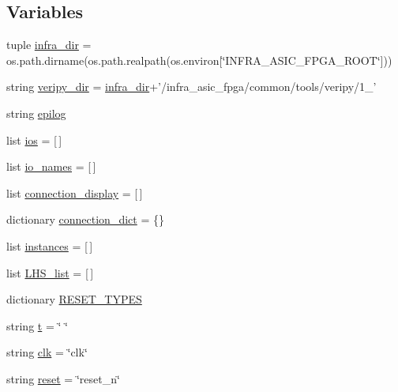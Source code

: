 \subsection*{Variables}
\begin{DoxyCompactItemize}
\item 
tuple \hyperlink{namespaceverilog__generator_ad90475de491c58d1bd0962f20cb9b26a}{infra\-\_\-dir} = os.\-path.\-dirname(os.\-path.\-realpath(os.\-environ\mbox{[}\char`\"{}I\-N\-F\-R\-A\-\_\-\-A\-S\-I\-C\-\_\-\-F\-P\-G\-A\-\_\-\-R\-O\-O\-T\char`\"{}\mbox{]}))
\item 
string \hyperlink{namespaceverilog__generator_aef66d07ac5937a888f2a6087df98f168}{veripy\-\_\-dir} = \hyperlink{namespaceverilog__generator_ad90475de491c58d1bd0962f20cb9b26a}{infra\-\_\-dir}+'/infra\-\_\-asic\-\_\-fpga/common/tools/veripy/1\-\_'
\item 
string \hyperlink{namespaceverilog__generator_a4524ff0556a251f5fb377c73c43c62fd}{epilog}
\item 
list \hyperlink{namespaceverilog__generator_ade554169d988ab15567d5895be125e8a}{ios} = \mbox{[}$\,$\mbox{]}
\item 
list \hyperlink{namespaceverilog__generator_a729e0a8bec14b9a53a961013b1c6b10d}{io\-\_\-names} = \mbox{[}$\,$\mbox{]}
\item 
list \hyperlink{namespaceverilog__generator_a0da1e4bf2a3336949d86ab239c0d48fa}{connection\-\_\-display} = \mbox{[}$\,$\mbox{]}
\item 
dictionary \hyperlink{namespaceverilog__generator_a220b4f3ab621882ef8a81bb413f8d7b1}{connection\-\_\-dict} = \{\}
\item 
list \hyperlink{namespaceverilog__generator_abfdc641e6360d79d9e9df91867d89549}{instances} = \mbox{[}$\,$\mbox{]}
\item 
list \hyperlink{namespaceverilog__generator_a1814507baaef36aff8b155155897e8b2}{L\-H\-S\-\_\-list} = \mbox{[}$\,$\mbox{]}
\item 
dictionary \hyperlink{namespaceverilog__generator_a0cff72beee2a3140fb4e24f0df14fa24}{R\-E\-S\-E\-T\-\_\-\-T\-Y\-P\-E\-S}
\item 
string \hyperlink{namespaceverilog__generator_aa57369757866dd14ee1936dffd0a5aa9}{t} = \char`\"{} \char`\"{}
\item 
string \hyperlink{namespaceverilog__generator_a084b763c0c3c8177e456acc947433d03}{clk} = \char`\"{}clk\char`\"{}
\item 
string \hyperlink{namespaceverilog__generator_ae8a856600314c3e197aec6b35a3a309c}{reset} = \char`\"{}reset\-\_\-n\char`\"{}

\end{DoxyCompactItemize}
